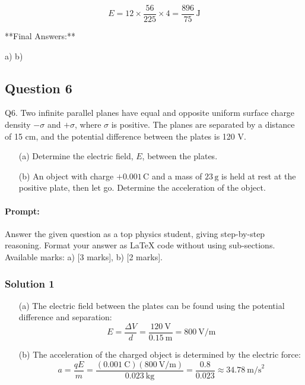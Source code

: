 \documentclass{article}
\begin{document}
\[
E = 12 \times \frac{56}{225} \times 4 = \frac{896}{75} \, \text{J}
\]

**Final Answers:**

a)   
b) 


\subsection{Question 6}
Q6. Two infinite parallel planes have equal and opposite uniform surface charge density $-\sigma$ and $+\sigma$, where $\sigma$ is positive. The planes are separated by a distance of 15 cm, and the potential difference between the plates is 120 V.

\begin{enumerate}
    \item[(a)] Determine the electric field, $E$, between the plates.
    \item[(b)] An object with charge $+0.001 \, \text{C}$ and a mass of $23 \, \text{g}$ is held at rest at the positive plate, then let go. Determine the acceleration of the object.
\end{enumerate}


\paragraph{Prompt: \\} 
Answer the given question as a top physics student, giving step-by-step reasoning. Format your answer as LaTeX code without using sub-sections. Available marks: a) [3 marks], b) [2 marks].

\subsubsection{Solution 1}
\begin{enumerate}
    \item[(a)] The electric field between the plates can be found using the potential difference and separation:
    \[
    E = \frac{\Delta V}{d} = \frac{120\ \text{V}}{0.15\ \text{m}} = 800\ \text{V/m}
    \]
    
    \item[(b)] The acceleration of the charged object is determined by the electric force:
    \[
    a = \frac{qE}{m} = \frac{(0.001\ \text{C})(800\ \text{V/m})}{0.023\ \text{kg}} = \frac{0.8}{0.023} \approx 34.78\ \text{m/s}^2
    \]
\end{enumerate}
\end{document}
